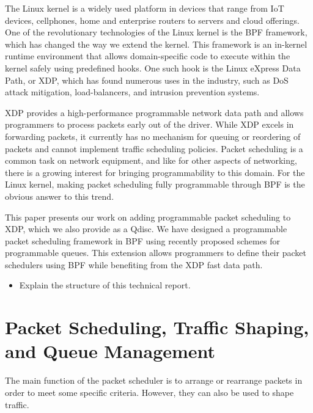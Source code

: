 \documentclass[sigconf, nonacm]{acmart}
\begin{document}
The Linux kernel is a widely used platform in devices that range from IoT devices, cellphones, home and enterprise routers to servers and cloud offerings. One of the revolutionary technologies of the Linux kernel is the BPF framework, which has changed the way we extend the kernel. This framework is an in-kernel runtime environment that allows domain-specific code to execute within the kernel safely using predefined hooks. One such hook is the Linux eXpress Data Path\cite{hoiland2018express}, or XDP, which has found numerous uses in the industry, such as DoS attack mitigation, load-balancers, and intrusion prevention systems.

XDP provides a high-performance programmable network data path and allows programmers to process packets early out of the driver. While XDP excels in forwarding packets, it currently has no mechanism for queuing or reordering of packets and cannot implement traffic scheduling policies. Packet scheduling is a common task on network equipment, and like for other aspects of networking, there is a growing interest for bringing programmability to this domain. For the Linux kernel, making packet scheduling fully programmable through BPF is the obvious answer to this trend.

This paper presents our work on adding programmable packet scheduling to XDP, which we also provide as a Qdisc. We have designed a programmable packet scheduling framework in BPF using recently proposed schemes for programmable queues. This extension allows programmers to define their packet schedulers using BPF while benefiting from the XDP fast data path.


\begin{itemize}
\item Explain the structure of this technical report.
\end{itemize}

\section{Packet Scheduling, Traffic Shaping, and Queue Management}

The main function of the packet scheduler is to arrange or rearrange packets
in order to meet some specific criteria. However, they can also be used to shape
traffic.

\end{document}
